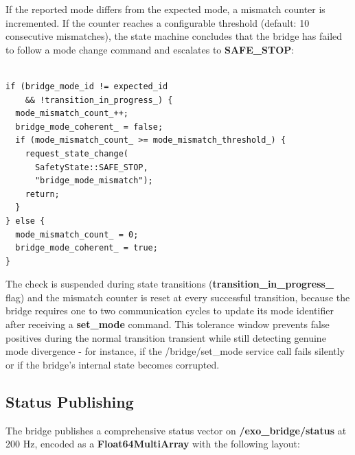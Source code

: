 If the reported mode differs from the expected mode, a mismatch counter is incremented. If the counter reaches a configurable threshold (default: 10 consecutive mismatches), the state machine concludes that the bridge has failed to follow a mode change command and escalates to \textbf{SAFE\_STOP}:

\begin{verbatim}

if (bridge_mode_id != expected_id
    && !transition_in_progress_) {
  mode_mismatch_count_++;
  bridge_mode_coherent_ = false;
  if (mode_mismatch_count_ >= mode_mismatch_threshold_) {
    request_state_change(
      SafetyState::SAFE_STOP,
      "bridge_mode_mismatch");
    return;
  }
} else {
  mode_mismatch_count_ = 0;
  bridge_mode_coherent_ = true;
}

\end{verbatim}

The check is suspended during state transitions (\textbf{transition\_in\_progress\_} flag) and the mismatch counter is reset at every successful transition, because the bridge requires one to two communication cycles to update its mode identifier after receiving a \textbf{set\_mode} command. This tolerance window prevents false positives during the normal transition transient while still detecting genuine mode divergence - for instance, if the /bridge/set\_mode service call fails silently or if the bridge's internal state becomes corrupted.

\subsection{Status Publishing}
The bridge publishes a comprehensive status vector on \textbf{/exo\_bridge/status} at 200 Hz, encoded as a \textbf{Float64MultiArray} with the following layout:

